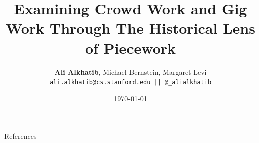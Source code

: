 \documentclass[aspectratio=169,12pt]{beamer} %
\title{Examining Crowd Work and Gig Work Through The Historical Lens of Piecework}
\author{\textbf{Ali Alkhatib}, Michael Bernstein, Margaret Levi\\
\texttt{ \scriptsize{\href{mailto:ali.alkhatib@cs.stanford.edu}{ali.alkhatib@cs.stanford.edu} ||
         \href{http://twitter.com/_alialkhatib}{@\_alialkhatib}}\normalsize{} }}
\institute[Stanford]{Stanford University}
\date{\today}
\newcommand{\onlyinsubfile}[1]{#1}
\newcommand{\notinsubfile}[1]{}
\begin{document}
\renewcommand{\onlyinsubfile}[1]{}
\renewcommand{\notinsubfile}[1]{#1}

\begin{frame}
\titlepage
\end{frame}









\begin{frame}[allowframebreaks]{References}
  \printbibliography{}
\end{frame}
\end{document}
